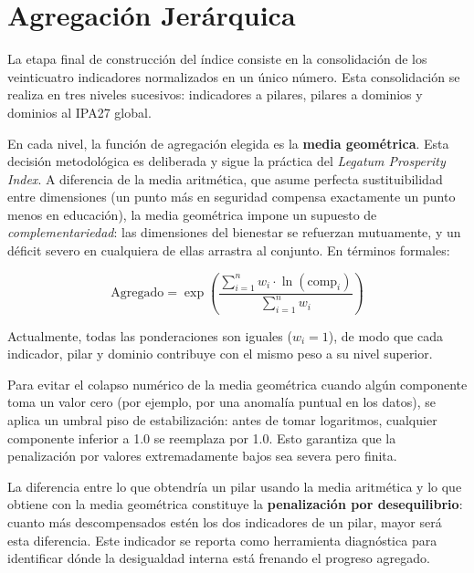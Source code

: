 \documentclass[12pt,a4paper]{article}
\begin{document}
\section{Agregación Jerárquica}

La etapa final de construcción del índice consiste en la consolidación de los veinticuatro indicadores normalizados en un único número. Esta consolidación se realiza en tres niveles sucesivos: indicadores a pilares, pilares a dominios y dominios al IPA27 global.

En cada nivel, la función de agregación elegida es la \textbf{media geométrica}. Esta decisión metodológica es deliberada y sigue la práctica del \textit{Legatum Prosperity Index}. A diferencia de la media aritmética, que asume perfecta sustituibilidad entre dimensiones (un punto más en seguridad compensa exactamente un punto menos en educación), la media geométrica impone un supuesto de \textit{complementariedad}: las dimensiones del bienestar se refuerzan mutuamente, y un déficit severo en cualquiera de ellas arrastra al conjunto. En términos formales:

\begin{equation}
\text{Agregado} = \exp\left(\frac{\sum_{i=1}^{n} w_i \cdot \ln(\text{comp}_i)}{\sum_{i=1}^{n} w_i}\right)
\end{equation}

Actualmente, todas las ponderaciones son iguales ($w_i = 1$), de modo que cada indicador, pilar y dominio contribuye con el mismo peso a su nivel superior.

Para evitar el colapso numérico de la media geométrica cuando algún componente toma un valor cero (por ejemplo, por una anomalía puntual en los datos), se aplica un umbral piso de estabilización: antes de tomar logaritmos, cualquier componente inferior a 1.0 se reemplaza por 1.0. Esto garantiza que la penalización por valores extremadamente bajos sea severa pero finita.

La diferencia entre lo que obtendría un pilar usando la media aritmética y lo que obtiene con la media geométrica constituye la \textbf{penalización por desequilibrio}: cuanto más descompensados estén los dos indicadores de un pilar, mayor será esta diferencia. Este indicador se reporta como herramienta diagnóstica para identificar dónde la desigualdad interna está frenando el progreso agregado.
\end{document}
